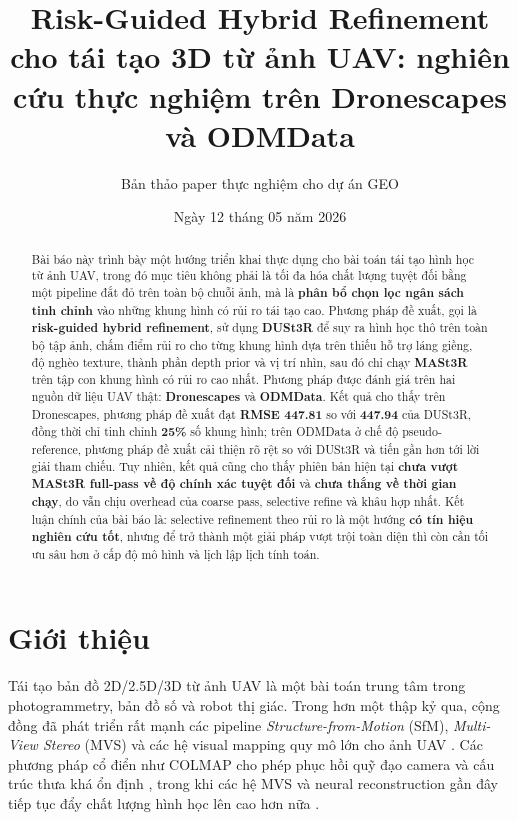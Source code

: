 \documentclass[11pt,a4paper]{article}
\title{Risk-Guided Hybrid Refinement cho tái tạo 3D từ ảnh UAV: nghiên cứu thực nghiệm trên Dronescapes và ODMData}
\author{Bản thảo paper thực nghiệm cho dự án GEO}
\date{Ngày 12 tháng 05 năm 2026}
\begin{document}
\maketitle

\begin{abstract}
Bài báo này trình bày một hướng triển khai thực dụng cho bài toán tái tạo hình học từ ảnh UAV, trong đó mục tiêu không phải là tối đa hóa chất lượng tuyệt đối bằng một pipeline đắt đỏ trên toàn bộ chuỗi ảnh, mà là \textbf{phân bổ chọn lọc ngân sách tinh chỉnh} vào những khung hình có rủi ro tái tạo cao. Phương pháp đề xuất, gọi là \textbf{risk-guided hybrid refinement}, sử dụng \textbf{DUSt3R} để suy ra hình học thô trên toàn bộ tập ảnh, chấm điểm rủi ro cho từng khung hình dựa trên thiếu hỗ trợ láng giềng, độ nghèo texture, thành phần depth prior và vị trí nhìn, sau đó chỉ chạy \textbf{MASt3R} trên tập con khung hình có rủi ro cao nhất. Phương pháp được đánh giá trên hai nguồn dữ liệu UAV thật: \textbf{Dronescapes} và \textbf{ODMData}. Kết quả cho thấy trên Dronescapes, phương pháp đề xuất đạt \textbf{RMSE 447.81} so với \textbf{447.94} của DUSt3R, đồng thời chỉ tinh chỉnh \textbf{25\%} số khung hình; trên ODMData ở chế độ pseudo-reference, phương pháp đề xuất cải thiện rõ rệt so với DUSt3R và tiến gần hơn tới lời giải tham chiếu. Tuy nhiên, kết quả cũng cho thấy phiên bản hiện tại \textbf{chưa vượt MASt3R full-pass về độ chính xác tuyệt đối} và \textbf{chưa thắng về thời gian chạy}, do vẫn chịu overhead của coarse pass, selective refine và khâu hợp nhất. Kết luận chính của bài báo là: selective refinement theo rủi ro là một hướng \textbf{có tín hiệu nghiên cứu tốt}, nhưng để trở thành một giải pháp vượt trội toàn diện thì còn cần tối ưu sâu hơn ở cấp độ mô hình và lịch lập lịch tính toán.
\end{abstract}

\section{Giới thiệu}

Tái tạo bản đồ 2D/2.5D/3D từ ảnh UAV là một bài toán trung tâm trong photogrammetry, bản đồ số và robot thị giác. Trong hơn một thập kỷ qua, cộng đồng đã phát triển rất mạnh các pipeline \textit{Structure-from-Motion} (SfM), \textit{Multi-View Stereo} (MVS) và các hệ visual mapping quy mô lớn cho ảnh UAV \citep{Colomina2014Unmanned,Jiang2017Efficient,Jiang2020Efficient,Liu2023Deep,Jiang2024Efficient}. Các phương pháp cổ điển như COLMAP cho phép phục hồi quỹ đạo camera và cấu trúc thưa khá ổn định \citep{Schonberger2016SfM}, trong khi các hệ MVS và neural reconstruction gần đây tiếp tục đẩy chất lượng hình học lên cao hơn nữa \citep{Liao2024High,Wu2025AerialBlocks}.
\end{document}
